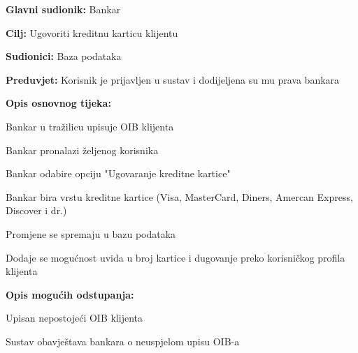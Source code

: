                 
                \noindent {}
                \begin{packed_item}
                
                  \item \textbf{Glavni sudionik: }Bankar
                  \item  \textbf{Cilj:} Ugovoriti kreditnu karticu klijentu
                  \item  \textbf{Sudionici:} Baza podataka
                  \item  \textbf{Preduvjet:} Korisnik je prijavljen u sustav i dodijeljena su mu prava bankara
                  \item  \textbf{Opis osnovnog tijeka:}
                  
                  \item[] \begin{packed_enum}
                
                	\item Bankar u tražilicu upisuje OIB klijenta
                	\item Bankar pronalazi željenog korisnika
                    \item Bankar odabire opciju "Ugovaranje kreditne kartice"
                    \item Bankar bira vrstu kreditne kartice (Visa, MasterCard, Diners, Amercan Express, Discover i dr.)
                    \item Promjene se spremaju u bazu podataka
                    \item Dodaje se mogućnost uvida u broj kartice i dugovanje preko korisničkog profila klijenta  
                  \end{packed_enum}
                  
                  \item  \textbf{Opis mogućih odstupanja:}
                  
                  \item[] \begin{packed_item}
                
                    \item[1.a] Upisan nepostojeći OIB klijenta
                    \item[] \begin{packed_enum}
                      
                      \item Sustav obavještava bankara o neuspjelom upisu OIB-a
                      
                    \end{packed_enum}
                    
                  \end{packed_item}
                \end{packed_item}
            
